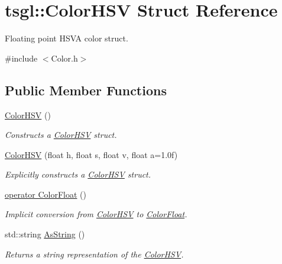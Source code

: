 \hypertarget{structtsgl_1_1_color_h_s_v}{}\section{tsgl\+:\+:Color\+H\+S\+V Struct Reference}
\label{structtsgl_1_1_color_h_s_v}


Floating point H\+S\+V\+A color struct.  




{\ttfamily \#include $<$Color.\+h$>$}

\subsection*{Public Member Functions}
\begin{DoxyCompactItemize}
\item 
\hyperlink{structtsgl_1_1_color_h_s_v_a36b4390ed6aba9f00ac9559ccca74f8a}{Color\+H\+S\+V} ()
\begin{DoxyCompactList}\small\item\em Constructs a \hyperlink{structtsgl_1_1_color_h_s_v}{Color\+H\+S\+V} struct. \end{DoxyCompactList}\item 
\hyperlink{structtsgl_1_1_color_h_s_v_a9ff97b9a0434ab700883b24c3738645d}{Color\+H\+S\+V} (float h, float s, float v, float a=1.\+0f)
\begin{DoxyCompactList}\small\item\em Explicitly constructs a \hyperlink{structtsgl_1_1_color_h_s_v}{Color\+H\+S\+V} struct. \end{DoxyCompactList}\item 
\hyperlink{structtsgl_1_1_color_h_s_v_a85a62f8d581801540717d3b3cd0ae782}{operator Color\+Float} ()
\begin{DoxyCompactList}\small\item\em Implicit conversion from \hyperlink{structtsgl_1_1_color_h_s_v}{Color\+H\+S\+V} to \hyperlink{structtsgl_1_1_color_float}{Color\+Float}. \end{DoxyCompactList}\item 
std\+::string \hyperlink{structtsgl_1_1_color_h_s_v_a17c6cd6cdc7487d2b0c1f19427f7fde8}{As\+String} ()
\begin{DoxyCompactList}\small\item\em Returns a string representation of the \hyperlink{structtsgl_1_1_color_h_s_v}{Color\+H\+S\+V}. \end{DoxyCompactList}\end{DoxyCompactItemize}
